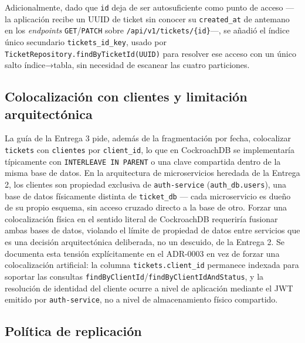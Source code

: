 Adicionalmente, dado que \texttt{id} deja de ser autosuficiente como punto de acceso —la
aplicación recibe un UUID de ticket sin conocer su \texttt{created\_at} de antemano en los
\emph{endpoints} \texttt{GET}/\texttt{PATCH} sobre \texttt{/api/v1/tickets/\{id\}}—, se añadió el índice único secundario
\texttt{tickets\_id\_key}, usado por \texttt{TicketRepository.findByTicketId(UUID)} para resolver
ese acceso con un único salto índice→tabla, sin necesidad de escanear las cuatro particiones.

\subsection{Colocalización con clientes y limitación arquitectónica}

La guía de la Entrega 3 pide, además de la fragmentación por fecha, colocalizar \texttt{tickets}
con \texttt{clientes} por \texttt{client\_id}, lo que en CockroachDB se implementaría típicamente
con \texttt{INTERLEAVE IN PARENT} o una clave compartida dentro de la misma base de datos. En la
arquitectura de microservicios heredada de la Entrega 2, los clientes son propiedad exclusiva de
\texttt{auth-service} (\texttt{auth\_db.users}), una base de datos físicamente distinta de
\texttt{ticket\_db} — cada microservicio es dueño de su propio esquema, sin acceso cruzado directo
a la base de otro. Forzar una colocalización física en el sentido literal de CockroachDB
requeriría fusionar ambas bases de datos, violando el límite de propiedad de datos entre servicios
que es una decisión arquitectónica deliberada, no un descuido, de la Entrega 2. Se documenta esta
tensión explícitamente en el ADR-0003 en vez de forzar una colocalización artificial: la columna
\texttt{tickets.client\_id} permanece indexada para soportar las consultas
\texttt{findByClientId}/\texttt{findByClientIdAndStatus}, y la resolución de identidad del cliente
ocurre a nivel de aplicación mediante el JWT emitido por \texttt{auth-service}, no a nivel de
almacenamiento físico compartido.

\subsection{Política de replicación}

